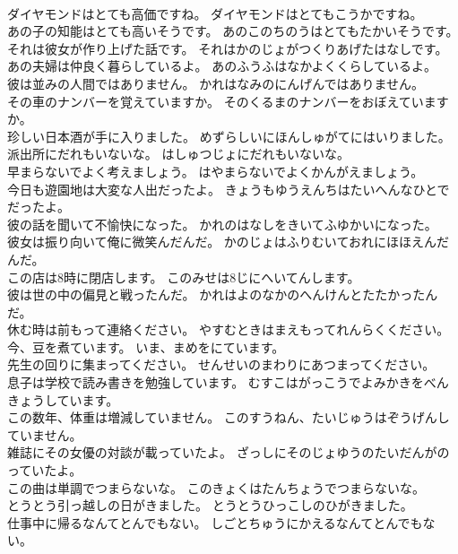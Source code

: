 \documentclass[8pt]{extreport}
\begin{document}
\begin{CJK}{UTF8}{min}
\\	ダイヤモンドはとても高価ですね。	ダイヤモンドはとてもこうかですね。 
\\	あの子の知能はとても高いそうです。	あのこのちのうはとてもたかいそうです。 
\\	それは彼女が作り上げた話です。	それはかのじょがつくりあげたはなしです。 
\\	あの夫婦は仲良く暮らしているよ。	あのふうふはなかよくくらしているよ。 
\\	彼は並みの人間ではありません。	かれはなみのにんげんではありません。 
\\	その車のナンバーを覚えていますか。	そのくるまのナンバーをおぼえていますか。 
\\	珍しい日本酒が手に入りました。	めずらしいにほんしゅがてにはいりました。 
\\	派出所にだれもいないな。	はしゅつじょにだれもいないな。 
\\	早まらないでよく考えましょう。	はやまらないでよくかんがえましょう。 
\\	今日も遊園地は大変な人出だったよ。	きょうもゆうえんちはたいへんなひとでだったよ。 
\\	彼の話を聞いて不愉快になった。	かれのはなしをきいてふゆかいになった。 
\\	彼女は振り向いて俺に微笑んだんだ。	かのじょはふりむいておれにほほえんだんだ。 
\\	この店は8時に閉店します。	このみせは8じにへいてんします。 
\\	彼は世の中の偏見と戦ったんだ。	かれはよのなかのへんけんとたたかったんだ。 
\\	休む時は前もって連絡ください。	やすむときはまえもってれんらくください。 
\\	今、豆を煮ています。	いま、まめをにています。 
\\	先生の回りに集まってください。	せんせいのまわりにあつまってください。 
\\	息子は学校で読み書きを勉強しています。	むすこはがっこうでよみかきをべんきょうしています。 
\\	この数年、体重は増減していません。	このすうねん、たいじゅうはぞうげんしていません。 
\\	雑誌にその女優の対談が載っていたよ。	ざっしにそのじょゆうのたいだんがのっていたよ。 
\\	この曲は単調でつまらないな。	このきょくはたんちょうでつまらないな。 
\\	とうとう引っ越しの日がきました。	とうとうひっこしのひがきました。 
\\	仕事中に帰るなんてとんでもない。	しごとちゅうにかえるなんてとんでもない。 

\end{CJK}
\end{document}

